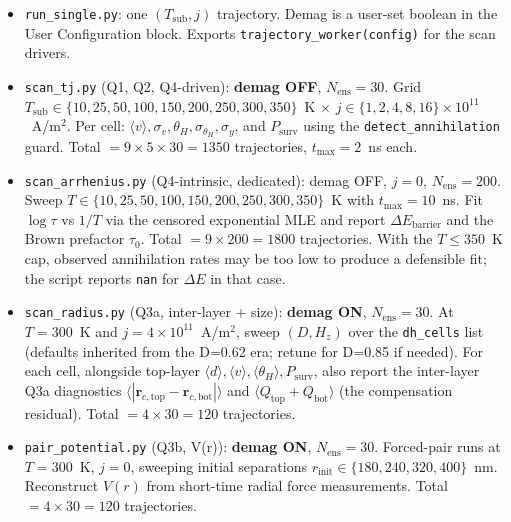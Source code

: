 \documentclass[11pt,a4paper]{article}
\newcommand{\mb}[1]{\mathbf{#1}}
\newcommand{\jcur}{j}
\begin{document}
\begin{itemize}[leftmargin=2em]
    \item \texttt{run\_single.py}: one $(T_{\text{sub}}, \jcur)$
    trajectory. Demag is a user-set boolean in the User
    Configuration block. Exports
    \texttt{trajectory\_worker(config)} for the scan drivers.

    \item \texttt{scan\_tj.py} (Q1, Q2, Q4-driven): \textbf{demag
    OFF}, $N_{\text{ens}} = 30$.
    Grid $T_{\text{sub}} \in \{10, 25, 50, 100, 150, 200, 250, 300,
    350\}$~K $\times$
    $\jcur \in \{1, 2, 4, 8, 16\} \times 10^{11}$~A/m$^2$.
    Per cell: $\langle v\rangle, \sigma_v, \theta_H,
    \sigma_{\theta_H}, \sigma_y$, and
    $P_{\text{surv}}$ using the \texttt{detect\_annihilation}
    guard. Total $= 9 \times 5 \times 30 = 1350$ trajectories,
    $t_{\max} = 2$~ns each.

    \item \texttt{scan\_arrhenius.py} (Q4-intrinsic, dedicated):
    demag OFF, $\jcur = 0$, $N_{\text{ens}} = 200$. Sweep
    $T \in \{10, 25, 50, 100, 150, 200, 250, 300, 350\}$~K with
    $t_{\max} = 10$~ns. Fit $\log \tau$ vs $1/T$ via the censored
    exponential MLE and report $\Delta E_{\text{barrier}}$ and the
    Brown prefactor $\tau_0$. Total $= 9 \times 200 = 1800$
    trajectories. With the $T \le 350$~K cap, observed annihilation
    rates may be too low to produce a defensible fit; the script
    reports \texttt{nan} for $\Delta E$ in that case.

    \item \texttt{scan\_radius.py} (Q3a, inter-layer + size):
    \textbf{demag ON}, $N_{\text{ens}} = 30$. At $T = 300$~K and
    $\jcur = 4 \times 10^{11}$~A/m$^2$, sweep $(D, H_z)$ over the
    \texttt{dh\_cells} list (defaults inherited from the D=0.62 era;
    retune for D=0.85 if needed). For each cell, alongside top-layer
    $\langle d\rangle, \langle v\rangle, \langle \theta_H\rangle,
    P_{\text{surv}}$, also report the inter-layer Q3a diagnostics
    $\langle |\mb{r}_{c,\text{top}} - \mb{r}_{c,\text{bot}}|\rangle$
    and $\langle Q_{\text{top}} + Q_{\text{bot}}\rangle$ (the
    compensation residual). Total $= 4 \times 30 = 120$ trajectories.

    \item \texttt{pair\_potential.py} (Q3b, V(r)): \textbf{demag
    ON}, $N_{\text{ens}} = 30$. Forced-pair runs at $T = 300$~K,
    $\jcur = 0$, sweeping initial separations
    $r_{\text{init}} \in \{180, 240, 320, 400\}$~nm. Reconstruct
    $V(r)$ from short-time radial force measurements. Total
    $= 4 \times 30 = 120$ trajectories.
\end{itemize}
\end{document}
